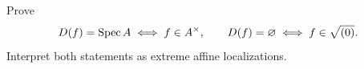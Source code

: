 \begin{problem}\label{chal:vi18-c05}
Prove
\[
D(f)=\operatorname{Spec} A\iff f\in A^\times,
\qquad
D(f)=\varnothing\iff f\in\sqrt{(0)}.
\]
Interpret both statements as extreme affine localizations.
\end{problem}
